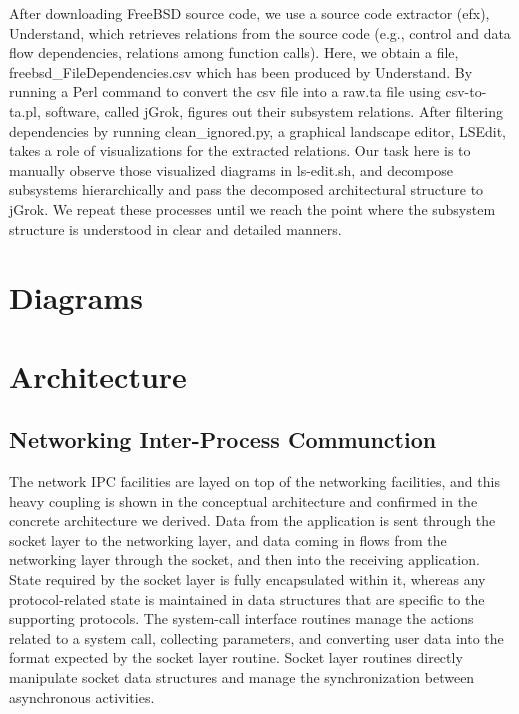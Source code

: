 \documentclass[12pt, dvipsnames, a4paper]{article}
\begin{document}
After downloading FreeBSD source code, we use a source code extractor (efx), Understand, which retrieves relations from the source code (e.g., control and data flow dependencies, relations among function calls). Here, we obtain a file, freebsd\_FileDependencies.csv which has been produced by Understand. By running a Perl command to convert the csv file into a raw.ta file using csv-to-ta.pl, software, called jGrok, figures out their subsystem relations. After filtering dependencies by running clean\_ignored.py, a graphical landscape editor, LSEdit, takes a role of visualizations for the extracted relations. Our task here is to manually observe those visualized diagrams in ls-edit.sh, and decompose subsystems hierarchically and pass the decomposed architectural structure to jGrok. We repeat these processes until we reach the point where the subsystem structure is understood in clear and detailed manners.

\section{Diagrams}
\lipsum[1]

\section{Architecture}
\subsection{Networking Inter-Process Communction}
The network IPC facilities are layed on top of the networking facilities, and this heavy coupling is shown in the conceptual architecture and confirmed in the concrete architecture we derived. Data from the application is sent through the socket layer to the networking layer, and data coming in flows from the networking layer through the socket, and then into the receiving application.  State required by the socket layer is fully encapsulated within it, whereas any protocol-related state is maintained in data structures that are specific to the supporting protocols. The system-call interface routines manage the actions related to a system call, collecting parameters, and converting user data into the format expected by the socket layer routine. Socket layer routines directly manipulate socket data structures and manage the synchronization between asynchronous activities.
\end{document}
